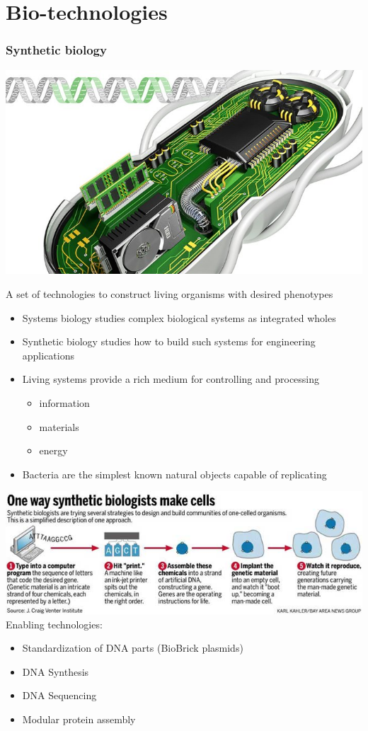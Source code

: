 \documentclass{beamer}
\begin{document}
\section{Bio-technologies}
\begin{frame}
	\frametitle{Synthetic biology}
	\begin{center}
		\includegraphics[scale=.4]{SynBio_main}
	\end{center}
	A set of technologies to construct living organisms with desired phenotypes
\end{frame}
\begin{frame}
		\begin{itemize}
		\item Systems biology studies complex biological systems as integrated wholes
		\item Synthetic biology studies how to build such systems for engineering applications
		\item Living systems provide a rich medium for controlling and processing
			\begin{itemize}
				\item information
				\item materials
				\item energy
			\end{itemize}
		\item Bacteria are the simplest known natural objects capable of replicating
	\end{itemize}
\end{frame}
\begin{frame}
	\includegraphics[scale=.5]{cell_synthesis}
	\\
	Enabling technologies:
	\begin{itemize}
		\item Standardization of DNA parts (BioBrick plasmids)
		\item DNA Synthesis
		\item DNA Sequencing
		\item Modular protein assembly
	\end{itemize}
\end{frame}
\end{document}
